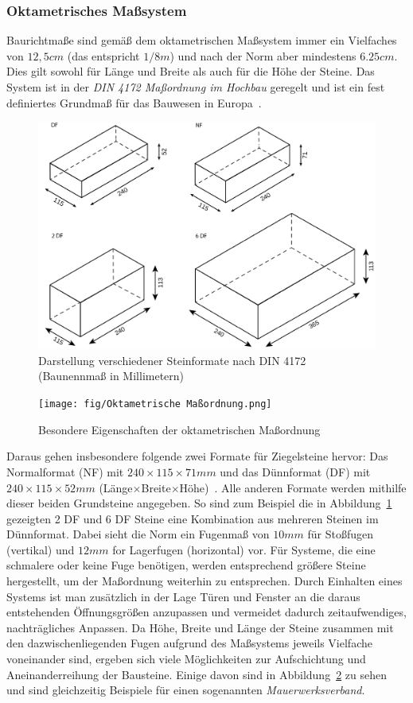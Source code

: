 \subsubsection*{Oktametrisches Maßsystem}
Baurichtmaße sind gemäß dem oktametrischen Maßsystem immer ein Vielfaches von \(12,5 cm\) (das entspricht \(1/8 m\)) und nach der Norm aber mindestens \(6.25cm\).
Dies gilt sowohl für Länge und Breite als auch für die Höhe der Steine.
Das System ist in der \textit{DIN 4172 Maßordnung im Hochbau} geregelt und ist ein fest definiertes Grundmaß für das Bauwesen in Europa~\cite{DIN417224}.
\begin{figure}[ht]
    \centering
    \includegraphics[width=0.8\columnwidth]{fig/Ziegelsteinformate DF NF 2DF 6DF.png}
    \caption{Darstellung verschiedener Steinformate nach DIN 4172 (Baunennmaß in Millimetern)~\cite{Steinfor38:online}}
    \label{fig:basics:Steinformate}
\end{figure}
\begin{figure}[ht]
  \centering
  \texttt{[image: fig/Oktametrische Maßordnung.png]}
  \caption{Besondere Eigenschaften der oktametrischen Maßordnung~\cite{Moro2021}}
  \label{fig:basics:OktametrischeMassordnung}
\end{figure}
Daraus gehen insbesondere folgende zwei Formate für Ziegelsteine hervor:
Das Normalformat (NF) mit \(240\times115\times71 mm\) und das Dünnformat (DF) mit \(240\times115\times52 mm\) (Länge$\times$Breite$\times$Höhe)~\cite{Moro2021}.
Alle anderen Formate werden mithilfe dieser beiden Grundsteine angegeben.
So sind zum Beispiel die in Abbildung~\ref{fig:basics:Steinformate} gezeigten 2 DF und 6 DF Steine eine Kombination aus mehreren Steinen im Dünnformat.
Dabei sieht die Norm ein Fugenmaß von \(10 mm\) für Stoßfugen (vertikal) und \(12 mm\) for Lagerfugen (horizontal) vor.
Für Systeme, die eine schmalere oder keine Fuge benötigen, werden entsprechend größere Steine hergestellt, um der Maßordnung weiterhin zu entsprechen.
Durch Einhalten eines Systems ist man zusätzlich in der Lage Türen und Fenster an die daraus entstehenden Öffnungsgrößen anzupassen und vermeidet dadurch zeitaufwendiges, nachträgliches Anpassen.
Da Höhe, Breite und Länge der Steine zusammen mit den dazwischenliegenden Fugen aufgrund des Maßsystems jeweils Vielfache voneinander sind, ergeben sich viele Möglichkeiten zur Aufschichtung und Aneinanderreihung der Bausteine.
Einige davon sind in Abbildung~\ref{fig:basics:OktametrischeMassordnung} zu sehen und sind gleichzeitig Beispiele für einen sogenannten \textit{Mauerwerksverband}.

